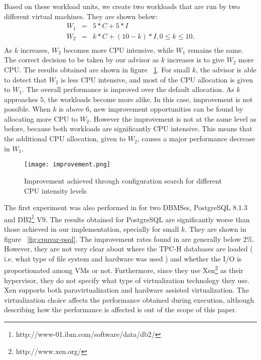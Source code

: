 Based on these workload units, we create two workloads that are run by two different virtual machines. They are shown below:
\begin{eqnarray*}
 W_{1} &=& 5*C + 5*I \\
 W_{2} &=& k*C + (10-k)*I, 0 \leq k \leq 10. \\
\end{eqnarray*}
As $k$ increases, $W_{2}$ becomes more CPU intensive, while $W_{1}$ remains the same. The correct decision to be taken by our advisor as $k$ increases is to give $W_{2}$ more CPU. The results obtained are shown in figure ~\ref{fig:intensity}. For small $k$, the advisor is able to detect that $W_{2}$ is less CPU intensive, and most of the CPU allocation is given to $W_{1}$. The overall performance is improved  over the default allocation. As $k$ approaches $5$, the workloads become more alike. In this case, improvement is not possible. When $k$ is above $6$, new improvement  opportunities can be found by allocating more CPU to $W_{2}$. However the improvement is not at the same level as before, because both workloads are significantly CPU intensive. This means that the additional CPU allocation, given to $W_{2}$, causes a major performance decrease in $W_{1}$.

\begin{figure}[ht]
 \centering
 \texttt{[image: improvement.png]}
 \caption{Improvement achieved through configuration search for different CPU intensity levels}
 \label{fig:intensity}
\end{figure} 

The first experiment was also performed in \cite{Soror:2008:AVM:1376616.1376711} for two DBMSes, PostgreSQL 8.1.3 and DB2\footnote{http://www-01.ibm.com/software/data/db2/} V9.  The results obtained for PostgreSQL are significantly worse than those achieved in our implementation, specially for small $k$. They are shown in figure ~\ref{fig:cpuvar-psql}. The improvement rates found in \cite{Soror:2008:AVM:1376616.1376711} are generally below $2\%$. However, they are not very clear about where the TPC-H databases are loaded ( i.e. what type of file system and hardware was used ) and whether the I/O is proportionated among VMs or not. Furthermore, since they use Xen\footnote{http://www.xen.org/} as their hypervisor, they do not specify what type of virtualization technology they use. Xen supports both paravirtualization and hardware assisted virtualization. The virtualization choice affects the performance obtained during execution, although describing how the performance is affected is out of the scope of this 
paper.

